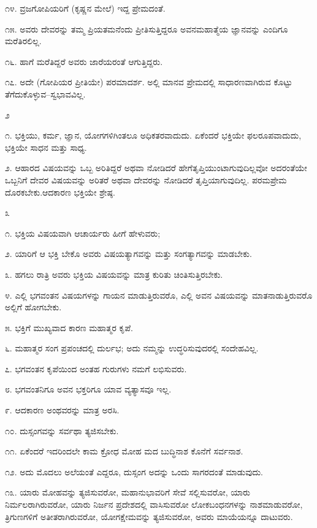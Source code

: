 ೧೪. ವ್ರಜಗೋಪಿಯರಿಗೆ (ಕೃಷ್ಣನ ಮೇಲೆ) ಇದ್ದ ಪ್ರೇಮದಂತೆ.

೧೫. ಅವರು ದೇವರನ್ನು ತಮ್ಮ ಪ್ರಿಯತಮನೆಂದು ಪ್ರೀತಿಸುತ್ತಿದ್ದರೂ ಅವನ\break ಮಹಾತ್ಮೆಯ ಜ್ಞಾನವನ್ನು ಎಂದಿಗೂ ಮರೆತಿರಲಿಲ್ಲ.

೧೬. ಹಾಗೆ ಮರೆತಿದ್ದರೆ ಅವರು ಜಾರೆಯರಂತೆ ಆಗುತ್ತಿದ್ದರು.

೧೭. ಅದೇ (ಗೋಪಿಯರ ಪ್ರೀತಿಯೇ) ಪರಮಾದರ್ಶ. ಅಲ್ಲಿ ಮಾನವ ಪ್ರೇಮದಲ್ಲಿ ಸಾಧಾರಣವಾಗಿರುವ ಕೊಟ್ಟು ತೆಗೆದುಕೊಳ್ಳುವ–ಸ್ವಭಾವವಿಲ್ಲ.

\begin{center}
೨
\end{center}

೧. ಭಕ್ತಿಯು, ಕರ್ಮ, ಜ್ಞಾನ, ಯೋಗಗಳಿಗಿಂತಲೂ ಅಧಿಕತರವಾದುದು. ಏಕೆಂದರೆ ಭಕ್ತಿಯೇ ಫಲರೂಪವಾದುದು, ಭಕ್ತಿಯೇ ಸಾಧನ ಮತ್ತು ಸಾಧ್ಯ.

೨. ಆಹಾರದ ವಿಷಯವನ್ನು ಒಬ್ಬ ಅರಿತಿದ್ದರೆ ಅಥವಾ ನೋಡಿದರೆ ಹೇಗೆ\break ತೃಪ್ತಿಯುಂಟಾಗುವುದಿಲ್ಲವೋ ಅದರಂತೆಯೇ ಒಬ್ಬನಿಗೆ ದೇವರ ವಿಷಯವನ್ನು ಅರಿತರೆ ಅಥವಾ ದೇವರನ್ನು ನೋಡಿದರೆ ತೃಪ್ತಿಯಾಗುವುದಿಲ್ಲ. ಪರಮಪ್ರೇಮ ದೊರಕಬೇಕು.\break ಆದಕಾರಣ ಭಕ್ತಿಯೇ ಶ್ರೇಷ್ಠ.

\begin{center}
೩
\end{center}

೧. ಭಕ್ತಿಯ ವಿಷಯವಾಗಿ ಆಚಾರ್ಯರು ಹೀಗೆ ಹೇಳುವರು;

೨. ಯಾರಿಗೆ ಆ ಭಕ್ತಿ ಬೇಕೊ ಅವರು ವಿಷಯತ್ಯಾಗವನ್ನು ಮತ್ತು ಸಂಗತ್ಯಾಗವನ್ನು ಮಾಡಬೇಕು.

೩. ಹಗಲು ರಾತ್ರಿ ಅವರು ಭಕ್ತಿಯ ವಿಷಯವನ್ನು ಮಾತ್ರ ಕುರಿತು ಚಿಂತಿಸುತ್ತಿರಬೇಕು.

೪. ಎಲ್ಲಿ ಭಗವಂತನ ವಿಷಯಗಳನ್ನು ಗಾಯನ ಮಾಡುತ್ತಿರುವರೊ, ಎಲ್ಲಿ ಅವನ ವಿಷಯವನ್ನು ಮಾತನಾಡುತ್ತಿರುವರೊ ಅಲ್ಲಿಗೆ ಹೋಗಬೇಕು.

೫. ಭಕ್ತಿಗೆ ಮುಖ್ಯವಾದ ಕಾರಣ ಮಹಾತ್ಮರ ಕೃಪೆ.

೬. ಮಹಾತ್ಮರ ಸಂಗ ಪ್ರಪಂಚದಲ್ಲಿ ದುರ್ಲಭ; ಅದು ನಮ್ಮನ್ನು ಉದ್ಧರಿಸುವುದರಲ್ಲಿ ಸಂದೇಹವಿಲ್ಲ.

೭. ಭಗವಂತನ ಕೃಪೆಯಿಂದ ಅಂತಹ ಗುರುಗಳು ನಮಗೆ ಲಭಿಸುವರು.

೮. ಭಗವಂತನಿಗೂ ಅವನ ಭಕ್ತರಿಗೂ ಯಾವ ವ್ಯತ್ಯಾಸವೂ ಇಲ್ಲ.

೯. ಆದಕಾರಣ ಅಂಥವರನ್ನು ಮಾತ್ರ ಅರಸಿ.

೧೦. ದುಸ್ಸಂಗವನ್ನು ಸರ್ವಥಾ ತ್ಯಜಿಸಬೇಕು.

೧೧. ಏಕೆಂದರೆ ಇದರಿಂದಲೇ ಕಾಮ ಕ್ರೋಧ ಮೋಹ ಮದ ಬುದ್ಧಿನಾಶ ಕೊನೆಗೆ ಸರ್ವನಾಶ.

೧೨. ಅದು ಮೊದಲು ಅಲೆಯಂತೆ ಎದ್ದರೂ, ದುಸ್ಸಂಗ ಅದನ್ನು ಒಂದು ಸಾಗರದಂತೆ ಮಾಡುವುದು.

೧೩. ಯಾರು ಮೋಹವನ್ನು ತ್ಯಜಿಸುವರೋ, ಮಹಾನುಭಾವರಿಗೆ ಸೇವೆ ಸಲ್ಲಿಸುವರೋ, ಯಾರು ನಿರ್ಮಲರಾಗಿರುವರೋ, ಯಾರು ನಿರ್ಜನ ಪ್ರದೇಶದಲ್ಲಿ ವಾಸಿಸುವರೋ ಲೋಕಬಂಧನಗಳನ್ನು ನಾಶಮಾಡುವರೋ, ತ್ರಿಗುಣಗಳಿಗೆ ಅತೀತರಾಗಿರುವರೋ, ಯೋಗಕ್ಷೇಮವನ್ನು ತ್ಯಜಿಸುವರೋ, ಅವರು ಮಾಯೆಯನ್ನೂ ದಾಟುವರು.

